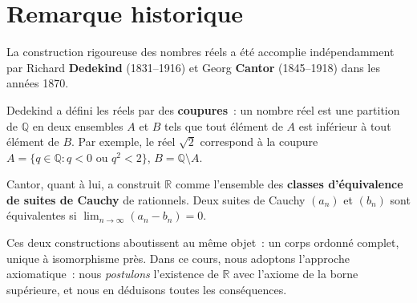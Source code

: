 \documentclass[12pt,a4paper,openany]{book}
\theoremstyle{definition}
\newcommand{\Q}{\mathbb{Q}}
\newcommand{\R}{\mathbb{R}}
\begin{document}
\begin{center}
\end{center}


\section*{Remarque historique}

La construction rigoureuse des nombres réels a été accomplie indépendamment par Richard \textbf{Dedekind} (1831--1916) et Georg \textbf{Cantor} (1845--1918) dans les années 1870.

Dedekind a défini les réels par des \textbf{coupures}~: un nombre réel est une partition de $\Q$ en deux ensembles $A$ et $B$ tels que tout élément de $A$ est inférieur à tout élément de $B$. Par exemple, le réel $\sqrt{2}$ correspond à la coupure $A = \{q \in \Q : q < 0 \text{ ou } q^2 < 2\}$, $B = \Q \setminus A$.

Cantor, quant à lui, a construit $\R$ comme l'ensemble des \textbf{classes d'équivalence de suites de Cauchy} de rationnels. Deux suites de Cauchy $(a_n)$ et $(b_n)$ sont équivalentes si $\lim_{n \to \infty}(a_n - b_n) = 0$.

Ces deux constructions aboutissent au même objet~: un corps ordonné complet, unique à isomorphisme près. Dans ce cours, nous adoptons l'approche axiomatique~: nous \emph{postulons} l'existence de $\R$ avec l'axiome de la borne supérieure, et nous en déduisons toutes les conséquences.


\end{document}
